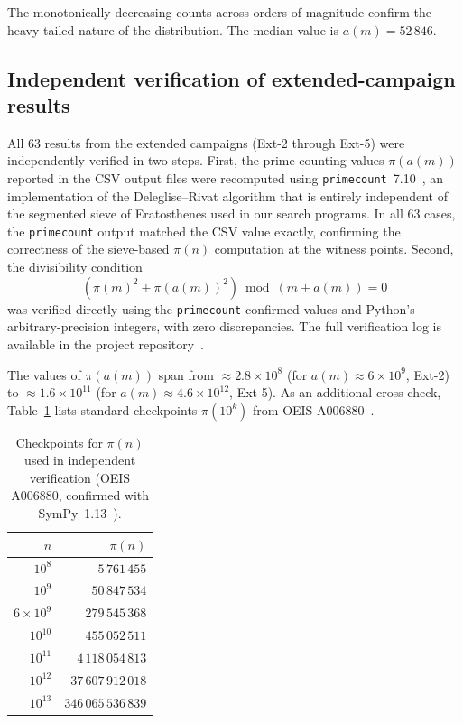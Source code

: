 \documentclass[11pt]{article}
\theoremstyle{definition}
\theoremstyle{remark}
\numberwithin{equation}{section}
\begin{document}
The monotonically decreasing counts across orders of magnitude
confirm the heavy-tailed nature of the distribution.
The median value is $a(m) = 52\,846$.

\subsection{Independent verification of extended-campaign results}

All $63$ results from the extended campaigns (Ext-2 through Ext-5)
were independently verified in two steps.
First, the prime-counting values $\pi(a(m))$ reported in the CSV
output files were recomputed using
\texttt{primecount}~7.10~\cite{primecount}, an implementation of
the Deleglise--Rivat algorithm that is entirely independent of the
segmented sieve of Eratosthenes used in our search programs.
In all $63$ cases, the \texttt{primecount} output matched the
CSV value exactly, confirming the correctness of the sieve-based
$\pi(n)$ computation at the witness points.
Second, the divisibility condition
\begin{equation}\label{eq:verify}
(\pi(m)^2 + \pi(a(m))^2) \bmod (m + a(m)) = 0
\end{equation}
was verified directly using the \texttt{primecount}-confirmed
values and Python's arbitrary-precision integers, with zero
discrepancies.
The full verification log is available in the project
repository~\cite{GithubRepo}.

The values of $\pi(a(m))$ span from
$\approx 2.8 \times 10^8$ (for $a(m) \approx 6 \times 10^9$,
Ext-2) to $\approx 1.6 \times 10^{11}$
(for $a(m) \approx 4.6 \times 10^{12}$, Ext-5).
As an additional cross-check, Table~\ref{tab:pi_checkpoints}
lists standard checkpoints $\pi(10^k)$ from OEIS
A006880~\cite{OEIS_A006880}.

\begin{table}[ht]
\centering
\caption{Checkpoints for $\pi(n)$ used in independent verification
(OEIS A006880, confirmed with SymPy~1.13~\cite{SymPy}).}
\label{tab:pi_checkpoints}
\begin{tabular}{rr}
\toprule
$n$ & $\pi(n)$ \\
\midrule
$10^{8}$ & $5\,761\,455$ \\
$10^{9}$ & $50\,847\,534$ \\
$6 \times 10^{9}$ & $279\,545\,368$ \\
$10^{10}$ & $455\,052\,511$ \\
$10^{11}$ & $4\,118\,054\,813$ \\
$10^{12}$ & $37\,607\,912\,018$ \\
$10^{13}$ & $346\,065\,536\,839$ \\
\bottomrule
\end{tabular}
\end{table}
\end{document}
